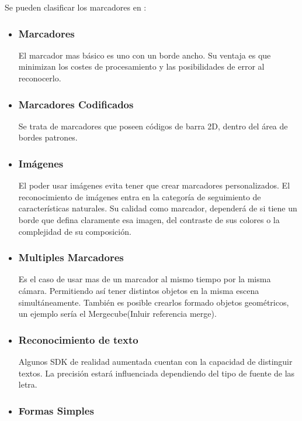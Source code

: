 	Se pueden clasificar los marcadores en \cite{linowes_babilinski_2017}:
	\begin{itemize}
		\item \subsubsection{Marcadores}El marcador mas básico es uno con un borde ancho. Su ventaja es que minimizan los costes de procesamiento y las posibilidades de error al reconocerlo.
		\item \subsubsection{Marcadores Codificados}Se trata de marcadores que poseen códigos de barra 2D, dentro del área de bordes patrones. 
		\item \subsubsection{Imágenes}El poder usar imágenes evita tener que crear marcadores personalizados. El reconocimiento de imágenes entra en la categoría de seguimiento de características naturales. Su calidad como marcador, dependerá de si tiene un borde que defina claramente esa imagen, del contraste de sus colores o la complejidad de su composición.
		\item \subsubsection{Multiples Marcadores}
		Es el caso de usar mas de un marcador al mismo tiempo por la misma cámara. Permitiendo así tener distintos objetos en la misma escena simultáneamente. También es posible crearlos formado objetos geométricos, un ejemplo sería el Mergecube(Inluir referencia merge).
		\item \subsubsection{Reconocimiento de texto}
		Algunos SDK de realidad aumentada cuentan con la capacidad de distinguir textos. La precisión estará influenciada dependiendo del tipo de fuente de las letra. 
		\item \subsubsection{Formas Simples}

\end{itemize}
